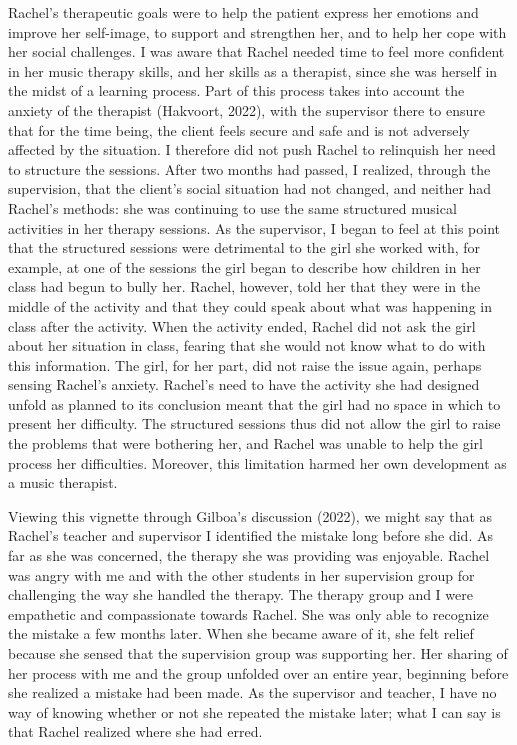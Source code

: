 \documentclass[authordate, empirical, issue]{jote-new-article}
\begin{document}
Rachel's therapeutic goals were to help the patient express her emotions and improve her self-image, to support and strengthen her, and to help her cope with her social challenges. I was aware that Rachel needed time to feel more confident in her music therapy skills, and her skills as a therapist, since she was herself in the midst of a learning process. Part of this process takes into account the anxiety of the therapist (Hakvoort, 2022), with the supervisor there to ensure that for the time being, the client feels secure and safe and is not adversely affected by the situation. I therefore did not push Rachel to relinquish her need to structure the sessions. After two months had passed, I realized, through the supervision, that the client's social situation had not changed, and neither had Rachel's methods: she was continuing to use the same structured musical activities in her therapy sessions. As the supervisor, I began to feel at this point that the structured sessions were detrimental to the girl she worked with, for example, at one of the sessions the girl began to describe how children in her class had begun to bully her. Rachel, however, told her that they were in the middle of the activity and that they could speak about what was happening in class after the activity. When the activity ended, Rachel did not ask the girl about her situation in class, fearing that she would not know what to do with this information. The girl, for her part, did not raise the issue again, perhaps sensing Rachel's anxiety. Rachel's need to have the activity she had designed unfold as planned to its conclusion meant that the girl had no space in which to present her difficulty. The structured sessions thus did not allow the girl to raise the problems that were bothering her, and Rachel was unable to help the girl process her difficulties. Moreover, this limitation harmed her own development as a music therapist.







Viewing this vignette through Gilboa's discussion (2022), we might say that as Rachel's teacher and supervisor I identified the mistake long before she did. As far as she was concerned, the therapy she was providing was enjoyable. Rachel was angry with me and with the other students in her supervision group for challenging the way she handled the therapy. The therapy group and I were empathetic and compassionate towards Rachel. She was only able to recognize the mistake a few months later. When she became aware of it, she felt relief because she sensed that the supervision group was supporting her. Her sharing of her process with me and the group unfolded over an entire year, beginning before she realized a mistake had been made. As the supervisor and teacher, I have no way of knowing whether or not she repeated the mistake later; what I can say is that Rachel realized where she had erred.
\end{document}
